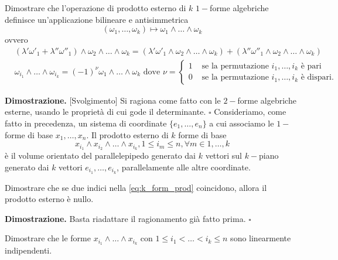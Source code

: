 \begin{exercise}
    Dimostrare che l'operazione di prodotto esterno di $k$ $1-$forme algebriche definisce un'applicazione bilineare e antisimmetrica
    $$
        (\omega_1, \ldots, \omega_k) \mapsto \omega_1 \wedge \ldots \wedge \omega_k
    $$
    ovvero
    \[\begin{aligned}
        &(\lambda' \omega'_1 + \lambda'' \omega''_1) \wedge \omega_2 \wedge \ldots \wedge \omega_k = (\lambda' \omega'_1 \wedge \omega_2 \wedge \ldots \wedge \omega_k) + (\lambda'' \omega''_1 \wedge \omega_2 \wedge \ldots \wedge \omega_k) \\
        &\omega_{i_1} \wedge \ldots \wedge \omega_{i_k} = (-1)^\nu \omega_1 \wedge \ldots \wedge \omega_k \text{ dove } \nu = \begin{cases}
            1 & \text{ se la permutazione } i_1, \ldots, i_k \text{ è pari} \\
            0 & \text{ se la permutazione } i_1, \ldots, i_k \text{ è dispari.}
        \end{cases}
    \end{aligned}\]
\end{exercise}
%
\noindent \textbf{Dimostrazione. } [Svolgimento]
    Si ragiona come fatto con le $2-$forme algebriche esterne, usando le proprietà di cui gode il determinante.
\hfill $\square$
%
Consideriamo, come fatto in precedenza, un sistema di coordinate $\{ e_1, \ldots, e_n \}$ a cui associamo le $1-$forme di base $x_1, \ldots, x_n$. Il prodotto esterno di $k$ forme di base
%
\begin{equation}
    x_{i_1} \wedge x_{i_2} \wedge \ldots \wedge x_{i_k}, 1 \leq i_m \leq n, \forall m \in {1, \ldots, k}
    \label{eq:k_form_prod}
\end{equation}
%
è il volume orientato del parallelepipedo generato dai $k$ vettori sul $k-$piano generato dai $k$ vettori $e_{i_1}, \ldots, e_{i_k}$, parallelamente alle altre coordinate. 
%
\vspace{0.5cm}
\begin{exercise}
    Dimostrare che se due indici nella \ref{eq:k_form_prod} coincidono, allora il prodotto esterno è nullo. 
\end{exercise}
%
\noindent \textbf{Dimostrazione. }
    Basta riadattare il ragionamento già fatto prima.
\hfill $\square$
%
\vspace{0.5cm}
\begin{exercise}
    Dimostrare che le forme $x_{i_1} \wedge \ldots \wedge x_{i_k}$ con $1 \leq i_1 < \ldots < i_k \leq n$ sono linearmente indipendenti.
\end{exercise}
